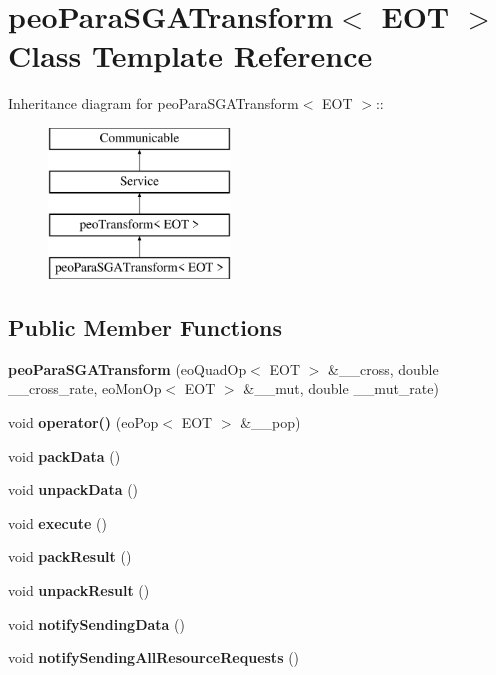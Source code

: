 \section{peo\-Para\-SGATransform$<$ EOT $>$ Class Template Reference}
\label{classpeo_para_s_g_a_transform}
Inheritance diagram for peo\-Para\-SGATransform$<$ EOT $>$::\begin{figure}[H]
\begin{center}
\leavevmode
\includegraphics[height=4cm]{classpeo_para_s_g_a_transform}
\end{center}
\end{figure}
\subsection*{Public Member Functions}
\begin{CompactItemize}
\item 
{\bf peo\-Para\-SGATransform} (eo\-Quad\-Op$<$ EOT $>$ \&\_\-\_\-cross, double \_\-\_\-cross\_\-rate, eo\-Mon\-Op$<$ EOT $>$ \&\_\-\_\-mut, double \_\-\_\-mut\_\-rate)\label{classpeo_para_s_g_a_transform_2052bca82fbbfe5455bf6f69246d4dbf}

\item 
void {\bf operator()} (eo\-Pop$<$ EOT $>$ \&\_\-\_\-pop)\label{classpeo_para_s_g_a_transform_669de7f7c6316fa745a15b909efb6527}

\item 
void {\bf pack\-Data} ()\label{classpeo_para_s_g_a_transform_fd278bcde58d29c9a343d5cbead81a1e}

\item 
void {\bf unpack\-Data} ()\label{classpeo_para_s_g_a_transform_a43a487a6e81791c8bbf6ce30f4336ab}

\item 
void {\bf execute} ()\label{classpeo_para_s_g_a_transform_c9de2100fb897177a401c634002f6dd9}

\item 
void {\bf pack\-Result} ()\label{classpeo_para_s_g_a_transform_ba08e224ceaa4149e8e1a88694a2ccf2}

\item 
void {\bf unpack\-Result} ()\label{classpeo_para_s_g_a_transform_257663dcdc6cc95b6183d472ffba1b2f}

\item 
void {\bf notify\-Sending\-Data} ()\label{classpeo_para_s_g_a_transform_4e19dfc22b6f69fa8b93537226551866}

\item 
void {\bf notify\-Sending\-All\-Resource\-Requests} ()\label{classpeo_para_s_g_a_transform_8a0316e33897c395a81787f59ea7a1c8}

\end{CompactItemize}

